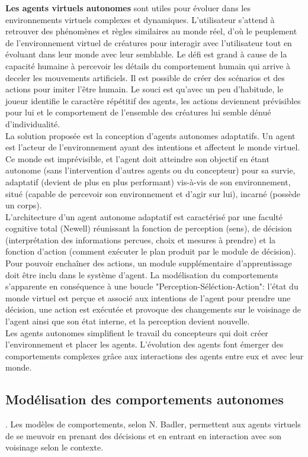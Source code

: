 \documentclass[11pt]{article}
\begin{document}
\textbf{Les agents virtuels autonomes} sont utiles pour évoluer dans les environnements virtuels complexes et dynamiques. L'utilisateur s'attend à retrouver des phénomènes et règles similaires au monde réel, d'où le peuplement de l'environnement virtuel de créatures pour interagir avec l'utilisateur tout en évoluant dans leur monde avec leur semblable. Le défi est grand à cause de la capacité humaine à percevoir les détails du comportement humain qui arrive à deceler les mouvements artificiels. Il est possible de créer des scénarios et des actions pour imiter l'être humain. Le souci est qu'avec un peu d'habitude, le joueur identifie le caractère répétitif des agents, les actions deviennent prévisibles  pour lui et le comportement de l'ensemble des créatures lui semble dénué d'individualité.\\
 La solution proposée est la conception d'agents autonomes adaptatifs. Un agent est l'acteur de l'environnement ayant des intentions et affectent le monde virtuel. Ce monde est imprévisible, et l'agent doit atteindre son objectif en étant autonome (sans l'intervention d'autres agents ou du concepteur) pour sa survie, adaptatif (devient de plus en plus performant) vis-à-vis de son environnement, situé (capable de percevoir son environnement et d'agir sur lui), incarné (possède un corps).\\
L'architecture d'un agent autonome adaptatif est caractérisé par une faculté cognitive total (Newell) réunissant la fonction de perception (sens), de décision (interprétation des informations percues, choix et mesures à prendre) et la fonction d'action (comment exécuter le plan produit par le module de décision). Pour pouvoir enchaîner des actions, un module supplémentaire d'apprentissage doit être inclu dans le système d'agent. La modélisation du comportements s'apparente en conséquence à une boucle "Perception-Séléction-Action": l'état du monde virtuel est perçue et associé aux intentions de l'agent pour prendre une décision, une action est exécutée et provoque des changements sur le voisinage de l'agent ainsi que son état interne, et la perception devient nouvelle.\\
Les agents autonomes simplifient le travail du concepteurs qui doit créer l'environnement et placer les agents. L'évolution des agents font émerger des comportements complexes grâce aux interactions des agents entre eux et avec leur monde.

\subsection{Modélisation des comportements autonomes}. Les modèles de comportements, selon N. Badler, permettent aux agents virtuels de se meuvoir en prenant des décisions et en entrant en interaction avec son voisinage selon le contexte.\\
\end{document}
